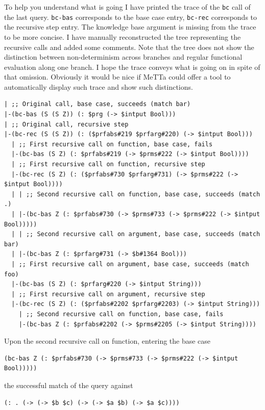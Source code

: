 \documentclass[]{report}
\begin{document}
To help you understand what is going I have printed the trace of the
\texttt{bc} call of the last query.
\texttt{bc-bas} corresponds to the base case entry,
\texttt{bc-rec} corresponds to the recursive step entry.
The knowledge base argument is missing from the trace to be more
concise.  I have manually reconstructed the tree representing the
recursive calls and added some comments.  Note that the tree does not
show the distinction between non-determinism across branches and
regular functional evaluation along one branch.  I hope the trace
conveys what is going on in spite of that omission.  Obviously it
would be nice if MeTTa could offer a tool to automatically display
such trace and show such distinctions.\\
\begin{footnotesize}
\begin{verbatim}
| ;; Original call, base case, succeeds (match bar)
|-(bc-bas (S (S Z)) (: $prg (-> $intput Bool)))
| ;; Original call, recursive step
|-(bc-rec (S (S Z)) (: ($prfabs#219 $prfarg#220) (-> $intput Bool)))
  | ;; First recursive call on function, base case, fails
  |-(bc-bas (S Z) (: $prfabs#219 (-> $prms#222 (-> $intput Bool))))
  | ;; First recursive call on function, recursive step
  |-(bc-rec (S Z) (: ($prfabs#730 $prfarg#731) (-> $prms#222 (-> $intput Bool))))
  | | ;; Second recursive call on function, base case, succeeds (match .)
  | |-(bc-bas Z (: $prfabs#730 (-> $prms#733 (-> $prms#222 (-> $intput Bool)))))
  | | ;; Second recursive call on argument, base case, succeeds (match bar)
  | |-(bc-bas Z (: $prfarg#731 (-> $b#1364 Bool)))
  | ;; First recursive call on argument, base case, succeeds (match foo)
  |-(bc-bas (S Z) (: $prfarg#220 (-> $intput String)))
  | ;; First recursive call on argument, recursive step
  |-(bc-rec (S Z) (: ($prfabs#2202 $prfarg#2203) (-> $intput String)))
    | ;; Second recursive call on function, base case, fails
    |-(bc-bas Z (: $prfabs#2202 (-> $prms#2205 (-> $intput String))))
\end{verbatim}
\end{footnotesize} Upon the second recursive call on function, entering the base case
\begin{small}
\begin{verbatim}
(bc-bas Z (: $prfabs#730 (-> $prms#733 (-> $prms#222 (-> $intput Bool)))))
\end{verbatim}
\end{small} the successful match of the query against
\begin{small}
\begin{verbatim}
(: . (-> (-> $b $c) (-> (-> $a $b) (-> $a $c))))
\end{verbatim}
\end{small}
\end{document}
